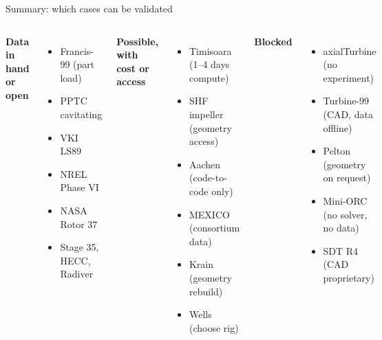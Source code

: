 \documentclass[aspectratio=169,10pt]{beamer}
\begin{document}
\begin{frame}{Summary: which cases can be validated}
\small
\begin{columns}[T]
\textbf{\textcolor{ok}{Data in hand or open}}
\begin{itemize}
\item Francis-99 (part load)
\item PPTC cavitating
\item VKI LS89
\item NREL Phase VI
\item NASA Rotor 37
\item Stage 35, HECC, Radiver
\end{itemize}
\textbf{\textcolor{part}{Possible, with cost or access}}
\begin{itemize}
\item Timisoara (1--4 days compute)
\item SHF impeller (geometry access)
\item Aachen (code-to-code only)
\item MEXICO (consortium data)
\item Krain (geometry rebuild)
\item Wells (choose rig)
\end{itemize}
\textbf{\textcolor{bad}{Blocked}}
\begin{itemize}
\item axialTurbine (no experiment)
\item Turbine-99 (CAD, data offline)
\item Pelton (geometry on request)
\item Mini-ORC (no solver, no data)
\item SDT R4 (CAD proprietary)
\end{itemize}
\end{columns}
\end{frame}
\end{document}
